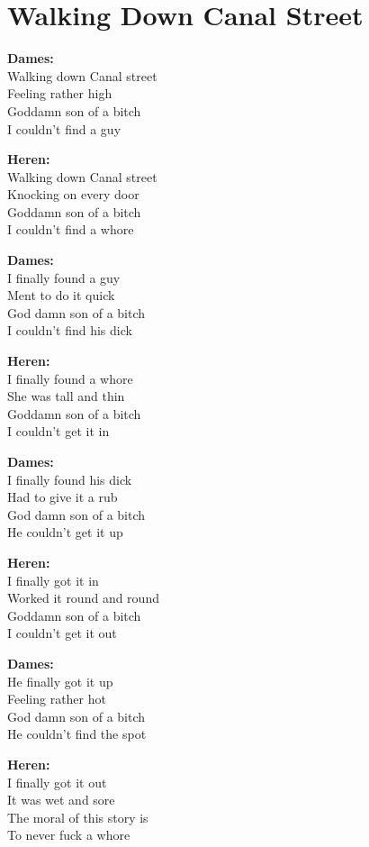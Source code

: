 \section{Walking Down Canal Street}

\textbf{Dames:}\\
Walking down Canal street\\
Feeling rather high\\
Goddamn son of a bitch\\
I couldn’t find a guy

\textbf{Heren:}\\
Walking down Canal street\\
Knocking on every door\\
Goddamn son of a bitch\\
I couldn't find a whore

\textbf{Dames:}\\
I finally found a guy\\ 
Ment to do it quick\\
God damn son of a bitch\\
I couldn’t find his dick

\textbf{Heren:}\\
I finally found a whore\\
She was tall and thin\\
Goddamn son of a bitch\\
I couldn't get it in

\textbf{Dames:}\\
I finally found his dick\\
Had to give it a rub\\
God damn son of a bitch\\
He couldn’t get it up

\textbf{Heren:}\\
I finally got it in\\
Worked it round and round\\
Goddamn son of a bitch\\
I couldn't get it out

\textbf{Dames:}\\
He finally got it up\\
Feeling rather hot\\
God damn son of a bitch\\
He couldn’t find the spot

\textbf{Heren:}\\
I finally got it out\\
It was wet and sore\\
The moral of this story is\\
To never fuck a whore
